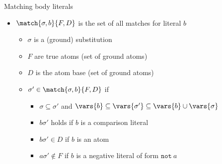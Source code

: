 \begin{frame}{Matching body literals}
  \bigskip
  \begin{itemize}
  \item<4-> \(\match{\sigma,b}{F,D}\) is the set of \alert{all matches for literal} \(b\)
    \begin{itemize}\normalsize
    \item \(\sigma\) is a (ground) substitution
    \item \(F\) are true atoms (set of ground atoms)
    \item \(D\) is the atom base (set of ground atoms)
      \medskip
    \item<5-7> \(\sigma' \in \match{\sigma,b}{F,D}\) if%
      \begin{itemize}\normalsize
      \item \(\sigma \subseteq \sigma'\) and \(\vars{b} \subseteq \vars{\sigma'} \subseteq \vars{b} \cup \vars{\sigma}\)
        \smallskip
      \item \(b\sigma'\) holds if \(b\) is a comparison literal
      \item \(b\sigma' \in D\) if \(b\) is an atom
      \item \(a\sigma' \not\in F\) if \(b\) is a negative literal of form \(\texttt{not}\ a\)
      \end{itemize}
    \end{itemize}
  \end{itemize}
\end{frame}
